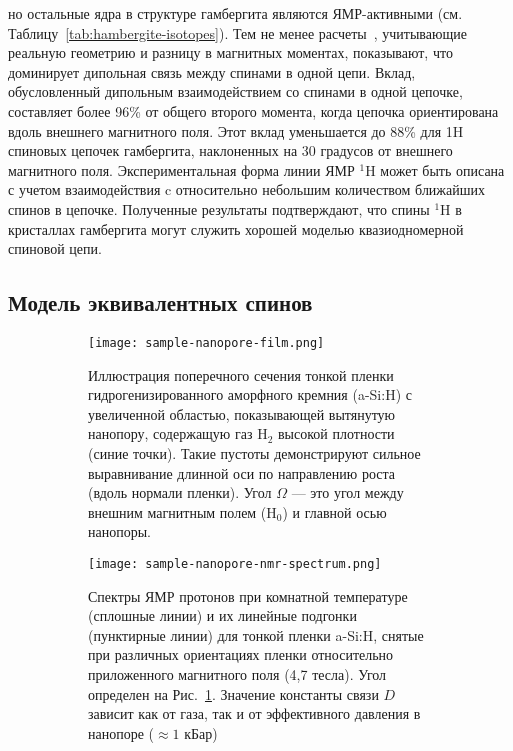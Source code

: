 но остальные ядра в структуре гамбергита являются ЯМР-активными (см. Таблицу~\ref{tab:hambergite-isotopes}).
Тем не менее расчеты~\cite{Bochkin2020jmr},
учитывающие реальную геометрию и разницу в магнитных моментах,
показывают, что доминирует дипольная связь между спинами в одной цепи.
Вклад, обусловленный дипольным взаимодействием со спинами в одной цепочке, составляет более 96\% от общего второго момента,
когда цепочка ориентирована вдоль внешнего магнитного поля.
Этот вклад уменьшается до 88\% для 1H спиновых цепочек гамбергита,
наклоненных на 30 градусов от внешнего магнитного поля.
Экспериментальная форма линии ЯМР $^1$H может быть описана
с учетом взаимодействия c относительно небольшим количеством ближайших спинов в цепочке.
Полученные результаты подтверждают,
что спины $^1$H в кристаллах гамбергита могут служить хорошей моделью квазиодномерной спиновой цепи.


\subsection{Модель эквивалентных спинов}
\label{sec:model-equivalent-spins}
\begin{figure}[H]
  \begin{subfigure}[t]{0.55\textwidth}
    \centering
    \texttt{[image: sample-nanopore-film.png]}
    \caption{
      Иллюстрация поперечного сечения тонкой пленки гидрогенизированного аморфного кремния (a-Si:H) с увеличенной областью,
      показывающей вытянутую нанопору,
      содержащую газ H$_2$ высокой плотности (синие точки).
      Такие пустоты демонстрируют сильное выравнивание длинной оси по направлению роста (вдоль нормали пленки).
      Угол $\Omega$ --- это угол между внешним магнитным полем (H$_0$) и главной осью нанопоры.
    }
    \label{fig:sample-nanopore-film}
  \end{subfigure}
  \hfill
  \begin{subfigure}[t]{0.4\textwidth}
    \centering
    \texttt{[image: sample-nanopore-nmr-spectrum.png]}
    \caption{
      Спектры ЯМР протонов при комнатной температуре (сплошные линии)
      и их линейные подгонки (пунктирные линии)
      для тонкой пленки a-Si:H,
      снятые при различных ориентациях пленки относительно приложенного магнитного поля (4,7 тесла).
      Угол определен на  Рис.~\ref{fig:sample-nanopore-film}.
      Значение константы связи $D$ зависит как от газа,
      так и от эффективного давления в нанопоре ($\approx 1$ кБар)
    }
    \label{fig:sample-nanopore-nmr-spectrum}
  \end{subfigure}
  \caption{}
\end{figure}


